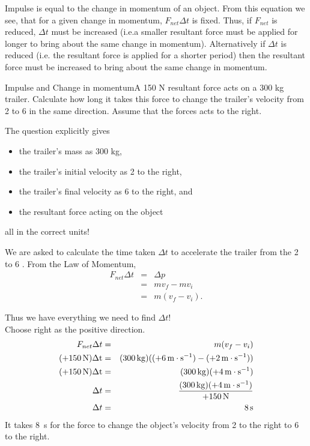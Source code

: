 Impulse is equal to the change in momentum of an object. From this equation we see, that for a given change in momentum, $F_{net}\Delta t$ is fixed. Thus, if $F_{net}$ is reduced, $\Delta t$ must be increased (i.e.\@ a smaller resultant force must be applied for longer to bring about the same change in momentum). Alternatively if $\Delta t$ is reduced (i.e.\@{} the resultant force is applied for a shorter period) then the resultant force must be increased to bring about the same change in momentum.\\

\begin{wex}{Impulse and Change in momentum}{A 150 N resultant force acts on a 300 kg trailer. Calculate how long it takes this force to change the trailer's velocity from 2 \ms to 6 \ms in the same direction. Assume that the forces acts to the right.}
{
The question explicitly gives
\begin{itemize}
\item{the trailer's mass as 300 kg,}
\item{the trailer's initial velocity as 2 \ms to the right,}
\item{the trailer's final velocity as 6 \ms to the right, and}
\item{the resultant force acting on the object}
\end{itemize}
all in the correct units!

We are asked to calculate the time taken $\Delta t$ to accelerate the trailer from the 2 to 6 \ms. From the Law of Momentum,
\begin{eqnarray*}
{F}_{net}\Delta t &=& \Delta p \\
&=& mv_f-mv_i\\
&=& m(v_f - v_i).
\end{eqnarray*}

Thus we have everything we need to find $\Delta t$!\\

Choose right as the positive direction.\\

\begin{eqnarray*}
F_{net}\Delta t &=& m(v_f - v_i)\\
(+150 \,\rm{N})\Delta t &=& (300 \,\mathrm{kg})((+6 \,\mathrm{m \cdot s^{-1}})-(+2 \,\mathrm{m \cdot s^{-1}}))\\
(+150 \,\rm{N})\Delta t &=& (300 \,\mathrm{kg})(+4 \,\mathrm{m \cdot s^{-1}})\\
\Delta t &=& \frac{(300 \,\mathrm{kg})(+4 \,\mathrm{m \cdot s^{-1}})}{+150 \,\rm{N}}\\
\Delta t &=& 8\,\mathrm{s}
\end{eqnarray*}
It takes 8~s for the force to change the object's velocity from 2 \ms to the right to 6 \ms to the right.}
\end{wex}

